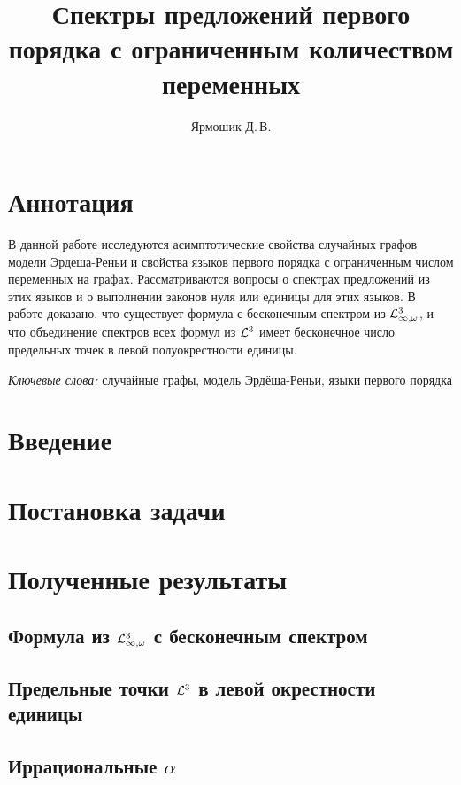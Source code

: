 \documentclass{mipt-thesis-bs}
\title{Спектры предложений первого порядка с ограниченным количеством переменных}
\author{Ярмошик Д.\,В.}
\begin{document}
\frontmatter
\titlecontents

\mainmatter

\chapter{Аннотация}
В данной работе исследуются асимптотические свойства случайных графов модели Эрдеша-Реньи и свойства языков первого порядка с ограниченным числом переменных на графах. Рассматриваются вопросы о спектрах предложений из этих языков и о выполнении законов нуля или единицы для этих языков. В работе доказано, что существует формула с бесконечным спектром из $\mathcal{L}^3_{\infty, \omega}$, и что объединение спектров всех формул из $\mathcal{L}^3$ имеет бесконечное число предельных точек в левой полуокрестности единицы.

\textit{Ключевые слова:} случайные графы, модель Эрдёша-Реньи, языки первого порядка

\chapter{Введение}


\chapter{Постановка задачи}


\chapter{Полученные результаты}
\section{Формула из $\mathcal{L}^3_{\infty, \omega}$ с бесконечным спектром}


\section{Предельные точки $\mathcal{L}^3$ в левой окрестности единицы}


\section{Иррациональные $\alpha$}

\end{document}
